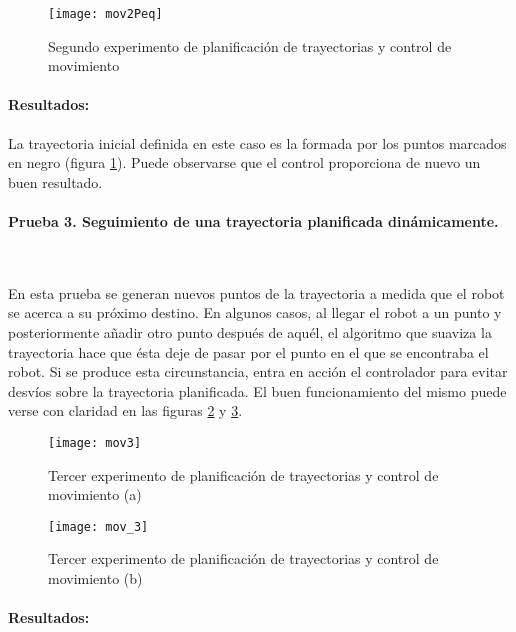 \begin{figure}[h]
  \centering\texttt{[image: mov2Peq]}\\
  \caption{Segundo experimento de planificación de trayectorias y control de movimiento}\label{fg:mov2}
\end{figure}

\paragraph{Resultados:}
La trayectoria inicial definida en este caso es la formada por los puntos marcados en negro (figura \ref{fg:mov2}). Puede observarse que el control proporciona de nuevo un buen resultado.

\clearpage
\paragraph{Prueba 3. Seguimiento de una trayectoria planificada dinámicamente.}\ %

\noindent
En esta prueba se generan nuevos puntos de la trayectoria a medida que el robot se acerca a su próximo destino. En algunos casos, al llegar el robot a un punto y posteriormente añadir otro punto después de aquél, el algoritmo que suaviza la trayectoria hace que ésta deje de pasar por el punto en el que se encontraba el robot. Si se produce esta circunstancia, entra en acción el controlador para evitar desvíos sobre la trayectoria planificada. El buen funcionamiento del mismo puede verse con claridad en las figuras \ref{fg:mov3a} y \ref{fg:mov3b}.

\begin{figure}[hbt]
  \centering\texttt{[image: mov3]}\\
    \caption{Tercer experimento de planificación de trayectorias y control de movimiento (a)}\label{fg:mov3a}
\end{figure}

 \begin{figure}[hbt]
\centering\texttt{[image: mov\_3]}
\caption{Tercer experimento de planificación de trayectorias y control de movimiento (b)}\label{fg:mov3b}
\end{figure}

\paragraph{Resultados:}

